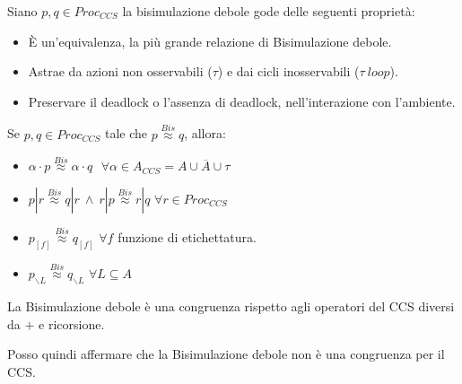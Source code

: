 Siano $p, q \in Proc_{CCS}$ la bisimulazione debole gode delle seguenti proprietà:
\begin{itemize}
    \item È un'equivalenza, la più grande relazione di Bisimulazione debole.
    \item Astrae da azioni non osservabili ($\tau$) e dai cicli inosservabili ($\tau \ loop$).
    \item Preservare il deadlock o l'assenza di deadlock, nell'interazione con l'ambiente.
\end{itemize}
\begin{teorema}
    Se $p, q \in Proc_{CCS}$ tale che $p \stackrel{Bis}{\approx} q$, allora:
    \begin{itemize}
        \item $\alpha \cdot p \stackrel{Bis}{\approx} \alpha \cdot q \ \ \ \forall \alpha \in A_{CCS} = A \cup \overline{A} \cup \tau$
        \item $p | r \stackrel{Bis}{\approx} q | r \ \land \ r | p \stackrel{Bis}{\approx} r | q$ $\forall r \in Proc_{CCS}$
        \item $p_{[f]} \stackrel{Bis}{\approx} q_{[f]}$ $\forall f$ funzione di etichettatura.
        \item $p_{\backslash L} \stackrel{Bis}{\approx} q_{\backslash L}$ $\forall L \subseteq A$
    \end{itemize}
    La Bisimulazione debole è una congruenza rispetto agli operatori del CCS diversi da $+$ e ricorsione.

    Posso quindi affermare che la Bisimulazione debole non è una congruenza per il CCS.
\end{teorema}
